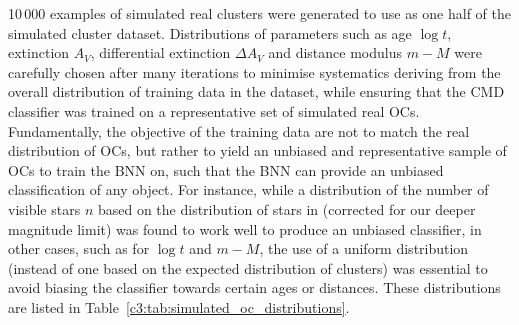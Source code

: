 10\,000 examples of simulated real clusters were generated to use as one half of the simulated cluster dataset. Distributions of parameters such as age $\log t$, extinction $A_V$, differential extinction $\Delta A_V$ and distance modulus $m-M$ were carefully chosen after many iterations to minimise systematics deriving from the overall distribution of training data in the dataset, while ensuring that the CMD classifier was trained on a representative set of simulated real OCs. Fundamentally, the objective of the training data are not to match the real distribution of OCs, but rather to yield an unbiased and representative sample of OCs to train the BNN on, such that the BNN can provide an unbiased classification of any object. For instance, while a distribution of the number of visible stars $n$ based on the distribution of stars in \cite{cantat-gaudin_clusters_2020} (corrected for our deeper magnitude limit) was found to work well to produce an unbiased classifier, in other cases, such as for $\log t$ and $m-M$, the use of a uniform distribution (instead of one based on the expected distribution of clusters) was essential to avoid biasing the classifier towards certain ages or distances. These distributions are listed in Table~\ref{c3:tab:simulated_oc_distributions}.



